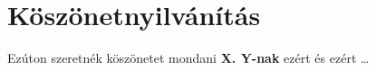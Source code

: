 \documentclass[12pt]{report}
\theoremstyle{definition}
\begin{document}

    \chapter*{Köszönetnyilvánítás}

Ezúton szeretnék köszönetet mondani \textbf{X. Y-nak} ezért és ezért \ldots
\end{document}

